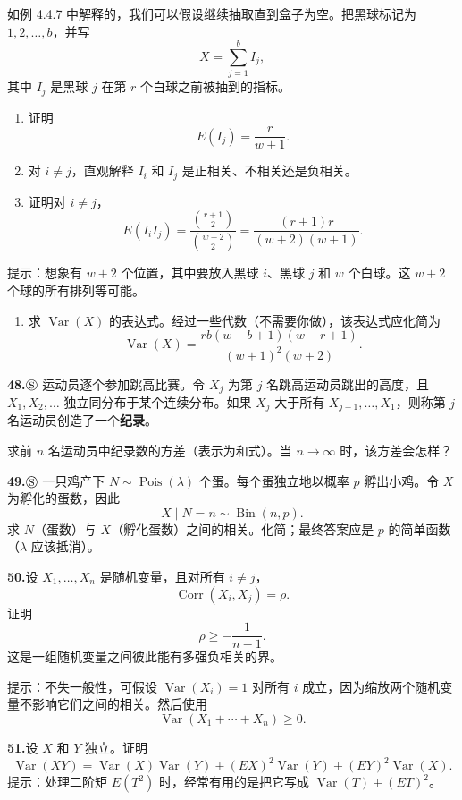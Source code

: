 \documentclass[UTF8, 12pt, fontset=fandol, oneside]{ctexart}
\begin{document}
如例 4.4.7 中解释的，我们可以假设继续抽取直到盒子为空。把黑球标记为 $1,2,\ldots,b$，并写
\[
  X=\sum_{j=1}^{b}I_j,
\]
其中 $I_j$ 是黑球 $j$ 在第 $r$ 个白球之前被抽到的指标。
\begin{enumerate}
  \item[(a)] 证明
  \[
    E(I_j)=\frac{r}{w+1}.
  \]
  \item[(b)] 对 $i\ne j$，直观解释 $I_i$ 和 $I_j$ 是正相关、不相关还是负相关。
  \item[(c)] 证明对 $i\ne j$，
  \[
    E(I_iI_j)=\frac{{r+1\choose 2}}{{w+2\choose 2}}
    =\frac{(r+1)r}{(w+2)(w+1)}.
  \]
\end{enumerate}
提示：想象有 $w+2$ 个位置，其中要放入黑球 $i$、黑球 $j$ 和 $w$ 个白球。这 $w+2$ 个球的所有排列等可能。
\begin{enumerate}
  \item[(d)] 求 $\operatorname{Var}(X)$ 的表达式。经过一些代数（不需要你做），该表达式应化简为
  \[
    \operatorname{Var}(X)=\frac{rb(w+b+1)(w-r+1)}{(w+1)^2(w+2)}.
  \]
\end{enumerate}

\noindent\textbf{48.}\quad $\circledS$ 运动员逐个参加跳高比赛。令 $X_j$ 为第 $j$ 名跳高运动员跳出的高度，且 $X_1,X_2,\ldots$ 独立同分布于某个连续分布。如果 $X_j$ 大于所有 $X_{j-1},\ldots,X_1$，则称第 $j$ 名运动员创造了一个\textbf{纪录}。

求前 $n$ 名运动员中纪录数的方差（表示为和式）。当 $n\to\infty$ 时，该方差会怎样？

\noindent\textbf{49.}\quad $\circledS$ 一只鸡产下 $N\sim \operatorname{Pois}(\lambda)$ 个蛋。每个蛋独立地以概率 $p$ 孵出小鸡。令 $X$ 为孵化的蛋数，因此
\[
  X\mid N=n\sim \operatorname{Bin}(n,p).
\]
求 $N$（蛋数）与 $X$（孵化蛋数）之间的相关。化简；最终答案应是 $p$ 的简单函数（$\lambda$ 应该抵消）。

\noindent\textbf{50.}\quad 设 $X_1,\ldots,X_n$ 是随机变量，且对所有 $i\ne j$，
\[
  \operatorname{Corr}(X_i,X_j)=\rho.
\]
证明
\[
  \rho\ge -\frac{1}{n-1}.
\]
这是一组随机变量之间彼此能有多强负相关的界。

提示：不失一般性，可假设 $\operatorname{Var}(X_i)=1$ 对所有 $i$ 成立，因为缩放两个随机变量不影响它们之间的相关。然后使用
\[
  \operatorname{Var}(X_1+\cdots+X_n)\ge 0.
\]

\noindent\textbf{51.}\quad 设 $X$ 和 $Y$ 独立。证明
\[
  \operatorname{Var}(XY)=\operatorname{Var}(X)\operatorname{Var}(Y)+(EX)^2\operatorname{Var}(Y)+(EY)^2\operatorname{Var}(X).
\]
提示：处理二阶矩 $E(T^2)$ 时，经常有用的是把它写成 $\operatorname{Var}(T)+(ET)^2$。
\end{document}
